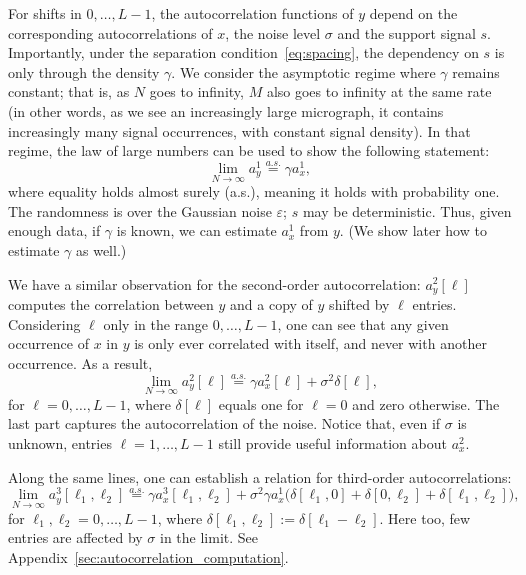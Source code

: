 \documentclass[12pt]{article}
\newcommand{\1}{\mathbf{1}}
\newcommand{\aseq}{\stackrel{a.s.}{=}}
\theoremstyle{plain}
\theoremstyle{definition}
\theoremstyle{remark}
\theoremstyle{plain}
\theoremstyle{remark}
\theoremstyle{plain}
\theoremstyle{plain}
\begin{document}
For shifts in $0, \ldots, L-1$, the autocorrelation functions of $y$ depend on the corresponding autocorrelations of $x$, the noise level $\sigma$ and the support signal $s$. Importantly, under the separation condition~\eqref{eq:spacing}, the dependency on $s$ is only through the density $\gamma$.
We consider the asymptotic regime where $\gamma$ remains constant; that is, as $N$ goes to infinity, $M$ also goes to infinity at the same rate (in other words, as we see an increasingly large micrograph, it contains increasingly many signal occurrences, with constant signal density). In that regime, the law of large numbers can be used to show the following statement:
\begin{equation} \label{eq:mean_micrograph}
\lim_{N\to\infty} a_y^1  \aseq \gamma a_{x}^1,
\end{equation}
where equality holds almost surely (a.s.), meaning it holds with probability one.
The randomness is over the Gaussian noise $\varepsilon$; $s$ may be deterministic.
Thus, given enough data, if $\gamma$ is known, we can estimate $a_x^1$ from $y$. (We show later how to estimate $\gamma$ as well.) 

We have a similar observation for the second-order autocorrelation: $a_y^2[\ell]$ computes the correlation between $y$ and a copy of $y$ shifted by $\ell$ entries. Considering $\ell$ only in the range $0, \ldots, L-1$, one can see that any given occurrence of $x$ in $y$ is only ever correlated with itself, and never with another occurrence. As a result,
\begin{equation}
\lim_{N\to\infty} a_y^2[\ell]  \aseq \gamma a_{x}^2[\ell] + \sigma^2\delta[\ell],
\label{eq:ac2_micrograph}
\end{equation}
for $\ell = 0, \ldots, L-1$, where $\delta[\ell]$ equals one for $\ell=0$ and zero otherwise. The last part captures the autocorrelation of the noise. Notice that, even if $\sigma$ is unknown, entries $\ell = 1, \ldots, L-1$ still provide useful information about $a_x^2$.

Along the same lines, one can establish a relation for third-order autocorrelations:
\begin{equation}
 \label{eq:ac3_micrograph}
\lim_{N\to\infty} a_y^3[\ell_1,\ell_2] \aseq \gamma a_{x}^3[\ell_1,\ell_2]  + \sigma^2\gamma a_{x}^1  \big(\delta[\ell_1,0]+\delta[0,\ell_2]
+\delta[\ell_1,\ell_2]\big),
\end{equation}
for $\ell_1,\ell_2 = 0, \ldots, L-1$, where $\delta[\ell_1,\ell_2]:=\delta[\ell_1-\ell_2]$.
Here too, few entries are affected by $\sigma$ in the limit.
See Appendix~\ref{sec:autocorrelation_computation}.
\end{document}
